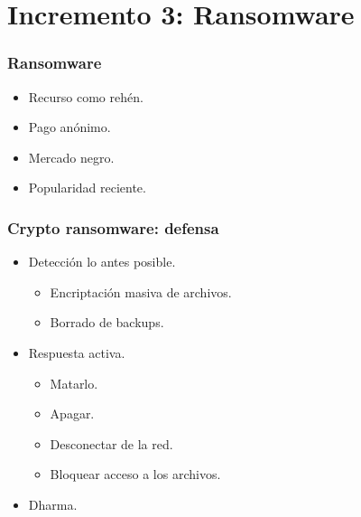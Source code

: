 \documentclass[a4paper,10pt]{beamer}
\begin{document}
\section{Incremento 3: Ransomware}
\begin{frame}[fragile]
	\frametitle{Ransomware}

	\begin{itemize}
		\item Recurso como rehén. %
		\item Pago anónimo. %
		\item Mercado negro. %
		\item Popularidad reciente. %
	\end{itemize}
\end{frame}

\begin{frame}[fragile]
	\frametitle{Crypto ransomware: defensa}

	\begin{itemize}
		\item Detección lo antes posible.
		\begin{itemize}
			\item Encriptación masiva de archivos. %
			\item Borrado de backups. %
		\end{itemize}
		\item Respuesta activa. %
		\begin{itemize}
			\item Matarlo.
			\item Apagar.
			\item Desconectar de la red.
			\item Bloquear acceso a los archivos.
		\end{itemize}
		\item Dharma.
	\end{itemize}
\end{frame}
\end{document}
